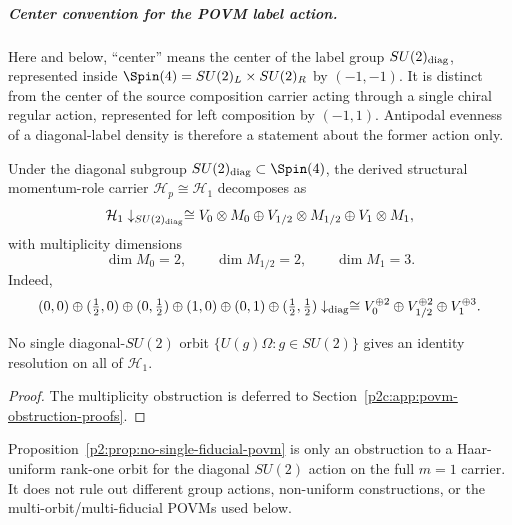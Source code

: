 \documentclass[11pt,a4paper]{article}
\begin{document}
\subparagraph{Center convention for the POVM label action.}
Here and below, ``center'' means the center of the label group
\(SU(2)_{\rm diag}\), represented inside
\(\Spin(4)=SU(2)_L\times SU(2)_R\) by \((-1,-1)\).  It is distinct from the
center of the source composition carrier acting through a single chiral
regular action, represented for left composition by \((-1,1)\).  Antipodal
evenness of a diagonal-label density is therefore a statement about the
former action only.

\begin{definition}
\label{p2:def:diag-decomp-H1}
Under the diagonal subgroup $SU(2)_{\rm diag}\subset \Spin(4)$, the derived structural momentum-role carrier $\mathcal H_p\cong\mathcal H_1$ decomposes as
\begin{equation}
\mathcal H_1\downarrow_{SU(2)_{\rm diag}}
\cong
V_0\otimes M_0
\oplus V_{1/2}\otimes M_{1/2}
\oplus V_1\otimes M_1,
\end{equation}
with multiplicity dimensions
\begin{equation}
\dim M_0=2,
\qquad
\dim M_{1/2}=2,
\qquad
\dim M_1=3.
\end{equation}
Indeed,
\[
(0,0)\oplus(\tfrac12,0)\oplus(0,\tfrac12)\oplus(1,0)\oplus(0,1)\oplus(\tfrac12,\tfrac12)
\downarrow_{\rm diag}
\cong
V_0^{\oplus2}\oplus V_{1/2}^{\oplus2}\oplus V_1^{\oplus3}.
\]
\end{definition}

\begin{proposition}
\label{p2:prop:no-single-fiducial-povm}
No single diagonal-$SU(2)$ orbit $\{U(g)\Omega:g\in SU(2)\}$ gives an identity resolution on all of $\mathcal H_1$.
\end{proposition}

\begin{proof}
The multiplicity obstruction is deferred to
Section~\ref{p2c:app:povm-obstruction-proofs}.
\end{proof}

\begin{remark}
Proposition~\ref{p2:prop:no-single-fiducial-povm} is only an obstruction to a Haar-uniform rank-one orbit for the diagonal \(SU(2)\) action on the full \(m=1\) carrier.  It does not rule out different group actions, non-uniform constructions, or the multi-orbit/multi-fiducial POVMs used below.
\end{remark}
\end{document}
